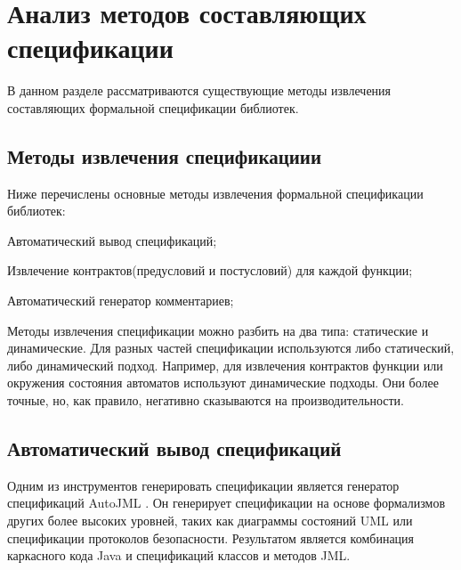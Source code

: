 \chapter{Анализ методов составляющих спецификации}

В данном разделе рассматриваются существующие методы извлечения составляющих формальной спецификации библиотек.

\section{Методы извлечения спецификациии}

Ниже перечислены основные методы извлечения формальной спецификации библиотек:
%
\begin{itemize*}
\item Автоматический вывод спецификаций;
\item Извлечение контрактов(предусловий и постусловий) для каждой функции;
\item Автоматический генератор комментариев;
\end{itemize*}
%

Методы извлечения спецификации можно разбить на два типа: статические и динамические.
Для разных частей спецификации используются либо статический, либо динамический подход.
Например, для извлечения контрактов функции или окружения состояния автоматов используют динамические подходы. Они более точные, но, как правило, негативно сказываются на производительности.

\section{Автоматический вывод спецификаций}

Одним из инструментов генерировать спецификации является генератор спецификаций AutoJML \cite{autoJML_paper} \cite{autoJML}.
Он генерирует спецификации на основе формализмов других более высоких уровней, таких как диаграммы состояний UML или спецификации протоколов безопасности. Результатом является комбинация каркасного кода Java и спецификаций классов и методов JML.

